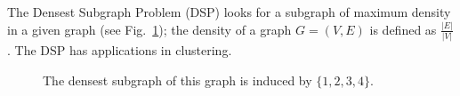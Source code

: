 \documentclass[a4paper]{book}
\theoremstyle{changebreak}                %
\begin{document}
The {\sc Densest Subgraph Problem} (DSP) looks
for a subgraph of maximum density in a given graph (see
Fig.~\ref{f:dsp}); the density of a graph $G=(V,E)$ is defined as
$\frac{|E|}{|V|}$. The DSP has applications in clustering.
\begin{figure}[!ht]
\begin{center}
\end{center}
\caption{The densest subgraph of this graph is induced by $\{1,2,3,4\}
$.}
\label{f:dsp}
\end{figure}
\end{document}
